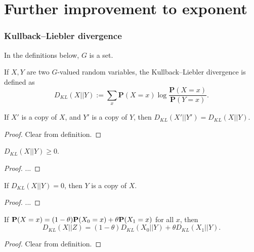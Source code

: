 \chapter{Further improvement to exponent}

\subsection{Kullback--Liebler divergence}

In the definitions below, $G$ is a set.

\begin{definition}\label{kl-div} If $X,Y$ are two $G$-valued random variables, the Kullback--Liebler divergence is defined as
  $$ D_{KL}(X||Y) := \sum_x \mathbf{P}(X=x) \log \frac{\mathbf{P}(X=x)}{\mathbf{P}(Y=x)}.$$
\end{definition}

\begin{lemma}\label{kl-div-copy}  If $X'$ is a copy of $X$, and $Y'$ is a copy of $Y$, then $D_{KL}(X'||Y') = D_{KL}(X||Y)$.
\end{lemma}

\begin{proof}  Clear from definition.
\end{proof}

\begin{lemma}\label{Gibbs}  $D_{KL}(X||Y) \geq 0$.
\end{lemma}

\begin{proof} ...
\end{proof}

\begin{lemma}\label{Gibbs-converse}  If $D_{KL}(X||Y) = 0$, then $Y$ is a copy of $X$.
\end{lemma}

\begin{proof} ...
\end{proof}

\begin{lemma}\label{kl-div-convex}  If ${\bf P}(X=x) = (1-\theta) {\bf P}(X_0=x) + \theta {\bf P}(X_1=x)$ for all $x$, then
$$D_{KL}(X||Z) = (1-\theta) D_{KL}(X_0||Y) + \theta D_{KL}(X_1||Y).$$
\end{lemma}

\begin{proof} Clear from definition.
\end{proof}

